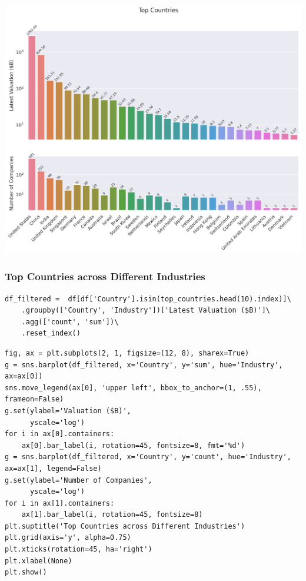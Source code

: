 \documentclass[a4paper,12pt]{article}
\begin{document}
\begin{center}
\includegraphics[width=.9\linewidth]{./.ob-jupyter/5728821c163ecf170189f8e29f22ba792d629424.png}
\label{}
\end{center}
\subsubsection{Top Countries across Different Industries}
\label{sec:org45e6d8e}

\begin{verbatim}
df_filtered =  df[df['Country'].isin(top_countries.head(10).index)]\
    .groupby(['Country', 'Industry'])['Latest Valuation ($B)']\
    .agg(['count', 'sum'])\
    .reset_index()
\end{verbatim}

\begin{verbatim}
fig, ax = plt.subplots(2, 1, figsize=(12, 8), sharex=True)
g = sns.barplot(df_filtered, x='Country', y='sum', hue='Industry', ax=ax[0])
sns.move_legend(ax[0], 'upper left', bbox_to_anchor=(1, .55), frameon=False)
g.set(ylabel='Valuation ($B)',
      yscale='log')
for i in ax[0].containers:
    ax[0].bar_label(i, rotation=45, fontsize=8, fmt='%d')
g = sns.barplot(df_filtered, x='Country', y='count', hue='Industry', ax=ax[1], legend=False)
g.set(ylabel='Number of Companies',
      yscale='log')
for i in ax[1].containers:
    ax[1].bar_label(i, rotation=45, fontsize=8)
plt.suptitle('Top Countries across Different Industries')
plt.grid(axis='y', alpha=0.75)
plt.xticks(rotation=45, ha='right')
plt.xlabel(None)
plt.show()
\end{verbatim}
\end{document}
